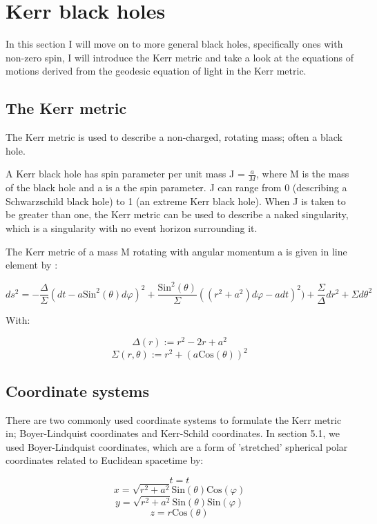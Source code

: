 \documentclass[oneside,openright,frontopenright, singlespacing]{dmathesis}
\begin{document}
\chapter{Kerr black holes}

	In this section I will move on to more general black holes, specifically ones with non-zero spin, I will introduce the Kerr metric and take a look at the equations of motions derived from the geodesic equation of light in the Kerr metric.

\section{The Kerr metric}

	The Kerr metric is used to describe a non-charged, rotating mass; often a black hole.

	 A Kerr black hole has spin parameter per unit mass J = $\frac{a}{M}$, where M is the mass of the black hole and a is a the spin parameter. J can range from 0 (describing a Schwarzschild black hole) to 1 (an extreme Kerr black hole). When J is taken to be greater than one, the Kerr metric can be used to describe a naked singularity, which is a singularity with no event horizon surrounding it.

	The Kerr metric of a mass M rotating with angular momentum a is given in line element by \cite{raquepas2017topics}:

	\[{ds^{2} = -\frac{\Delta}{\Sigma}(dt-a\mbox{Sin}^2(\theta)d\varphi)^2+\frac{\mbox{Sin}^2(\theta)}{\Sigma}((r^2+a^2)d\varphi-adt)^2)+\frac{\Sigma}{\Delta}dr^2+\Sigma d\theta^2}\]

\vspace{1em}
	With:
	
	\[\Delta(r) := r^2 - 2r + a^2\]
	\[\Sigma(r, \theta) := r^2 +(a\mbox{Cos}(\theta))^2\]

\section{Coordinate systems}

	There are two commonly used coordinate systems to formulate the Kerr metric in; Boyer-Lindquist coordinates\cite{boyer1967maximal} and Kerr-Schild coordinates\cite{debney1969solutions}. In section 5.1, we used Boyer-Lindquist coordinates, which are a form of 'stretched' spherical polar coordinates related to Euclidean spacetime by:

	\[t=t\]
	\[x = \sqrt{r^2+a^2}\mbox{Sin}(\theta)\mbox{Cos}(\varphi)\]
	\[y = \sqrt{r^2+a^2}\mbox{Sin}(\theta)\mbox{Sin}(\varphi)\]
	\[z = r\mbox{Cos}(\theta)\]
\end{document}
